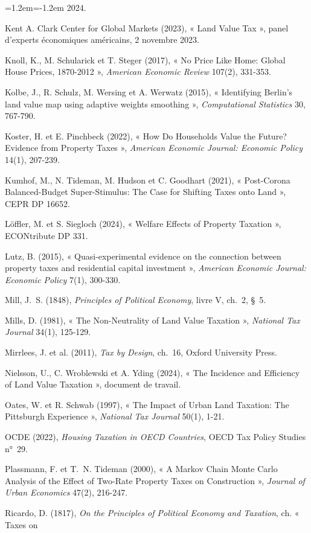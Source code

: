 \documentclass[11pt,a4paper]{article}
\begin{document}
\begin{list}{}{\leftmargin=1.2em\itemindent=-1.2em\itemsep=1pt\parsep=0pt}
2024.
\item Kent A. Clark Center for Global Markets (2023), « Land Value Tax », panel d'experts
économiques américains, 2 novembre 2023.
\item Knoll, K., M. Schularick et T. Steger (2017), « No Price Like Home: Global House Prices,
1870-2012 », \emph{American Economic Review} 107(2), 331-353.
\item Kolbe, J., R. Schulz, M. Wersing et A. Werwatz (2015), « Identifying Berlin's land value
map using adaptive weights smoothing », \emph{Computational Statistics} 30, 767-790.
\item Koster, H. et E. Pinchbeck (2022), « How Do Households Value the Future? Evidence from
Property Taxes », \emph{American Economic Journal: Economic Policy} 14(1), 207-239.
\item Kumhof, M., N. Tideman, M. Hudson et C. Goodhart (2021), « Post-Corona Balanced-Budget
Super-Stimulus: The Case for Shifting Taxes onto Land », CEPR DP 16652.
\item Löffler, M. et S. Siegloch (2024), « Welfare Effects of Property Taxation », ECONtribute
DP 331.
\item Lutz, B. (2015), « Quasi-experimental evidence on the connection between property taxes and
residential capital investment », \emph{American Economic Journal: Economic Policy} 7(1), 300-330.
\item Mill, J.~S. (1848), \emph{Principles of Political Economy}, livre V, ch.~2, §~5.
\item Mills, D. (1981), « The Non-Neutrality of Land Value Taxation », \emph{National Tax Journal}
34(1), 125-129.
\item Mirrlees, J. et al. (2011), \emph{Tax by Design}, ch.~16, Oxford University Press.
\item Nielsson, U., C. Wroblewski et A. Yding (2024), « The Incidence and Efficiency of Land Value
Taxation », document de travail.
\item Oates, W. et R. Schwab (1997), « The Impact of Urban Land Taxation: The Pittsburgh
Experience », \emph{National Tax Journal} 50(1), 1-21.
\item OCDE (2022), \emph{Housing Taxation in OECD Countries}, OECD Tax Policy Studies n°~29.
\item Plassmann, F. et T.~N. Tideman (2000), « A Markov Chain Monte Carlo Analysis of the Effect of
Two-Rate Property Taxes on Construction », \emph{Journal of Urban Economics} 47(2), 216-247.
\item Ricardo, D. (1817), \emph{On the Principles of Political Economy and Taxation}, ch. « Taxes on

\end{list}
\end{document}
